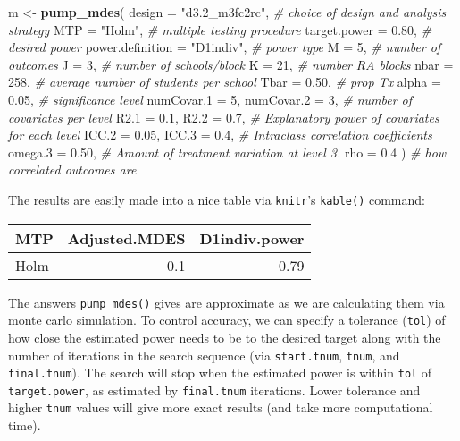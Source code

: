 \documentclass[
]{article}
\newenvironment{Shaded}{\begin{snugshade}}{\end{snugshade}}
\newcommand{\CommentTok}[1]{\textcolor[rgb]{0.56,0.35,0.01}{\textit{#1}}}
\newcommand{\DataTypeTok}[1]{\textcolor[rgb]{0.13,0.29,0.53}{#1}}
\newcommand{\DecValTok}[1]{\textcolor[rgb]{0.00,0.00,0.81}{#1}}
\newcommand{\FloatTok}[1]{\textcolor[rgb]{0.00,0.00,0.81}{#1}}
\newcommand{\KeywordTok}[1]{\textcolor[rgb]{0.13,0.29,0.53}{\textbf{#1}}}
\newcommand{\NormalTok}[1]{#1}
\newcommand{\StringTok}[1]{\textcolor[rgb]{0.31,0.60,0.02}{#1}}
\begin{document}
\begin{Shaded}
\begin{Highlighting}[]
\NormalTok{m \textless{}{-}}\StringTok{ }\KeywordTok{pump\_mdes}\NormalTok{(}
            \DataTypeTok{design =} \StringTok{"d3.2\_m3fc2rc"}\NormalTok{, }\CommentTok{\# choice of design and analysis strategy}
            \DataTypeTok{MTP =} \StringTok{"Holm"}\NormalTok{, }\CommentTok{\# multiple testing procedure}
            \DataTypeTok{target.power =} \FloatTok{0.80}\NormalTok{, }\CommentTok{\# desired power}
            \DataTypeTok{power.definition =} \StringTok{"D1indiv"}\NormalTok{, }\CommentTok{\# power type}
            \DataTypeTok{M =} \DecValTok{5}\NormalTok{, }\CommentTok{\# number of outcomes}
            \DataTypeTok{J =} \DecValTok{3}\NormalTok{, }\CommentTok{\# number of schools/block}
            \DataTypeTok{K =} \DecValTok{21}\NormalTok{, }\CommentTok{\# number RA blocks}
            \DataTypeTok{nbar =} \DecValTok{258}\NormalTok{, }\CommentTok{\# average number of students per school}
            \DataTypeTok{Tbar =} \FloatTok{0.50}\NormalTok{, }\CommentTok{\# prop Tx}
            \DataTypeTok{alpha =} \FloatTok{0.05}\NormalTok{, }\CommentTok{\# significance level}
            \DataTypeTok{numCovar.1 =} \DecValTok{5}\NormalTok{, }\DataTypeTok{numCovar.2 =} \DecValTok{3}\NormalTok{, }\CommentTok{\# number of covariates per level}
            \DataTypeTok{R2.1 =} \FloatTok{0.1}\NormalTok{, }\DataTypeTok{R2.2 =} \FloatTok{0.7}\NormalTok{, }\CommentTok{\# Explanatory power of covariates for each level}
            \DataTypeTok{ICC.2 =} \FloatTok{0.05}\NormalTok{, }\DataTypeTok{ICC.3 =} \FloatTok{0.4}\NormalTok{, }\CommentTok{\# Intraclass correlation coefficients}
            \DataTypeTok{omega.3 =} \FloatTok{0.50}\NormalTok{, }\CommentTok{\# Amount of treatment variation at level 3.}
            \DataTypeTok{rho =} \FloatTok{0.4}\NormalTok{ ) }\CommentTok{\# how correlated outcomes are}
\end{Highlighting}
\end{Shaded}

The results are easily made into a nice table via \texttt{knitr}'s
\texttt{kable()} command:

\begin{tabular}{l|r|r}
\hline
MTP & Adjusted.MDES & D1indiv.power\\
\hline
Holm & 0.1 & 0.79\\
\hline
\end{tabular}

The answers \texttt{pump\_mdes()} gives are approximate as we are
calculating them via monte carlo simulation. To control accuracy, we can
specify a tolerance (\texttt{tol}) of how close the estimated power
needs to be to the desired target along with the number of iterations in
the search sequence (via \texttt{start.tnum}, \texttt{tnum}, and
\texttt{final.tnum}). The search will stop when the estimated power is
within \texttt{tol} of \texttt{target.power}, as estimated by
\texttt{final.tnum} iterations. Lower tolerance and higher \texttt{tnum}
values will give more exact results (and take more computational time).
\end{document}
